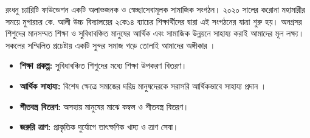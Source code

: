 \documentclass[11pt]{article}
\begin{document}
\vspace{0.05cm}

\begin{multicols}{2}

    \begin{tcolorbox}[
        enhanced,
        title=\textbf{আমাদের লক্ষ্য ও উদ্দেশ্য},
        colback=white,
        colframe=navyblue,
        coltitle=white,
        colbacktitle=navyblue,
        arc=2mm,
        fonttitle=\large\bfseries,
        attach boxed title to top left={xshift=10pt, yshift=-10pt, yshifttext=-1.5ex},
        boxed title style={colback=navyblue, arc=1mm, boxrule=0pt},
        top=12pt, bottom=8pt, left=8pt, right=8pt
    ]
        \fontsize{9.5}{13.5}\selectfont
        রংধনু চ্যারিটি ফাউন্ডেশন একটি অলাভজনক ও স্বেচ্ছাসেবামূলক সামাজিক সংগঠন। ২০২০ সালের করোনা মহামারীর সময়ে মুগারচর কে. আলী উচ্চ বিদ্যালয়ের  ২কে১৪ ব্যাচের শিক্ষার্থীদের দ্বারা এই সংগঠনের যাত্রা শুরু হয়। অনগ্রসর শিশুদের মানসম্মত শিক্ষা ও সুবিধাবঞ্চিত মানুষের আর্থিক এবং সামাজিক উন্নয়নে সাহায্য করাই  আমাদের মূল লক্ষ্য। সকলের সম্মিলিত প্রচেষ্টায় একটি সুন্দর সমাজ গড়ে তোলাই আমাদের অঙ্গীকার ।
    \end{tcolorbox}

    \begin{tcolorbox}[
        enhanced,
        title=\textbf{আমাদের মূল কার্যক্রমসমূহ},
        colback=white,
        colframe=deepcyan,
        coltitle=white,
        colbacktitle=deepcyan,
        arc=2mm,
        fonttitle=\large\bfseries,
        attach boxed title to top left={xshift=10pt, yshift=-10pt, yshifttext=-1.5ex},
        boxed title style={colback=deepcyan, arc=1mm, boxrule=0pt},
        top=12pt, bottom=8pt, left=8pt, right=8pt
    ]
        \fontsize{9.5}{13.5}\selectfont
        \begin{itemize}
            \item \textbf{শিক্ষা প্রকল্প:} সুবিধাবঞ্চিত শিশুদের মধ্যে শিক্ষা উপকরণ বিতরণ।
            \item \textbf{আর্থিক সাহায্য:} বিশেষ ক্ষেত্রে সমাজের দরিদ্র মানুষদেরকে সরাসরি আর্থিকভাবে সাহায্য প্রদান ।
            \item \textbf{শীতবস্ত্র বিতরণ:} অসহায় মানুষের মাঝে কম্বল ও শীতবস্ত্র বিতরণ।
            \item \textbf{জরুরি ত্রাণ:} প্রাকৃতিক দুর্যোগে তাৎক্ষণিক খাদ্য ও ত্রাণ সেবা।
        \end{itemize}
    \end{tcolorbox}

\end{multicols}
\end{document}
